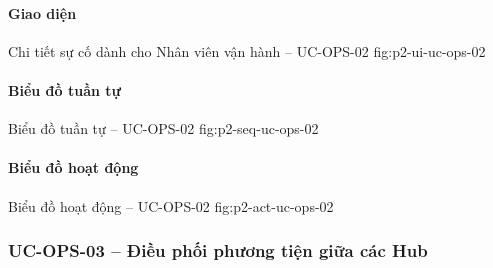 \par\medskip
\noindent\begin{minipage}{\linewidth}
\paragraph{Giao diện}
  {Chi tiết sự cố dành cho Nhân viên vận hành -- UC-OPS-02}
  {fig:p2-ui-uc-ops-02}
  {}
\end{minipage}\par

\clearpage
\paragraph{Biểu đồ tuần tự}
  {Biểu đồ tuần tự -- UC-OPS-02}
  {fig:p2-seq-uc-ops-02}

\clearpage
\paragraph{Biểu đồ hoạt động}
  {Biểu đồ hoạt động -- UC-OPS-02}
  {fig:p2-act-uc-ops-02}

\clearpage

\subsubsection{UC-OPS-03 -- Điều phối phương tiện giữa các Hub}


